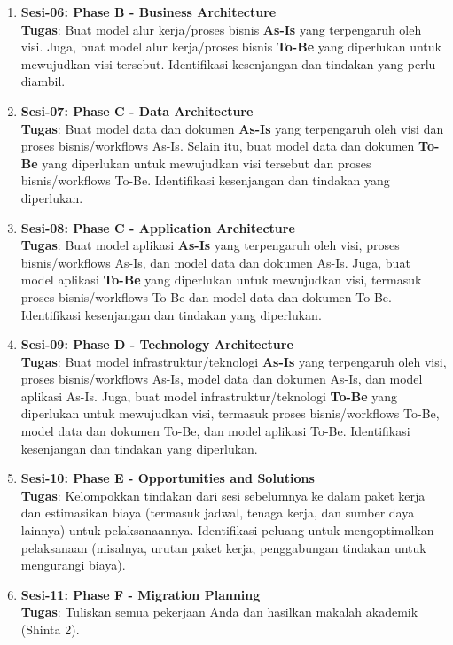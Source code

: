 \begin{enumerate}
	\item \textbf{Sesi-06: Phase B - Business Architecture} \\
	\textbf{Tugas}: Buat model alur kerja/proses bisnis \textbf{As-Is} yang terpengaruh oleh visi. Juga, buat model alur kerja/proses bisnis \textbf{To-Be} yang diperlukan untuk mewujudkan visi tersebut. Identifikasi kesenjangan dan tindakan yang perlu diambil.
	
	\item \textbf{Sesi-07: Phase C - Data Architecture} \\
	\textbf{Tugas}: Buat model data dan dokumen \textbf{As-Is} yang terpengaruh oleh visi dan proses bisnis/workflows As-Is. Selain itu, buat model data dan dokumen \textbf{To-Be} yang diperlukan untuk mewujudkan visi tersebut dan proses bisnis/workflows To-Be. Identifikasi kesenjangan dan tindakan yang diperlukan.
	
	\item \textbf{Sesi-08: Phase C - Application Architecture} \\
	\textbf{Tugas}: Buat model aplikasi \textbf{As-Is} yang terpengaruh oleh visi, proses bisnis/workflows As-Is, dan model data dan dokumen As-Is. Juga, buat model aplikasi \textbf{To-Be} yang diperlukan untuk mewujudkan visi, termasuk proses bisnis/workflows To-Be dan model data dan dokumen To-Be. Identifikasi kesenjangan dan tindakan yang diperlukan.
	
	\item \textbf{Sesi-09: Phase D - Technology Architecture} \\
	\textbf{Tugas}: Buat model infrastruktur/teknologi \textbf{As-Is} yang terpengaruh oleh visi, proses bisnis/workflows As-Is, model data dan dokumen As-Is, dan model aplikasi As-Is. Juga, buat model infrastruktur/teknologi \textbf{To-Be} yang diperlukan untuk mewujudkan visi, termasuk proses bisnis/workflows To-Be, model data dan dokumen To-Be, dan model aplikasi To-Be. Identifikasi kesenjangan dan tindakan yang diperlukan.
	
	\item \textbf{Sesi-10: Phase E - Opportunities and Solutions} \\
	\textbf{Tugas}: Kelompokkan tindakan dari sesi sebelumnya ke dalam paket kerja dan estimasikan biaya (termasuk jadwal, tenaga kerja, dan sumber daya lainnya) untuk pelaksanaannya. Identifikasi peluang untuk mengoptimalkan pelaksanaan (misalnya, urutan paket kerja, penggabungan tindakan untuk mengurangi biaya).
	
	\item \textbf{Sesi-11: Phase F - Migration Planning} \\
	\textbf{Tugas}: Tuliskan semua pekerjaan Anda dan hasilkan makalah akademik (Shinta 2).
	

\end{enumerate}
